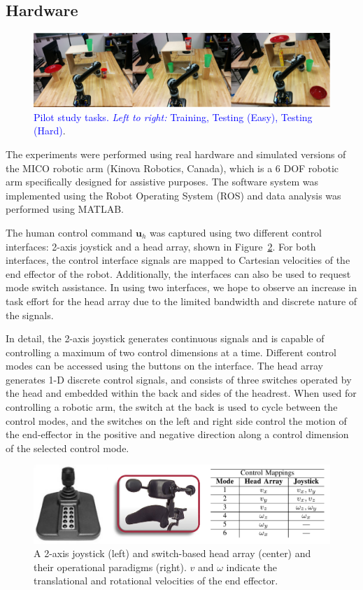 \documentclass[conference]{IEEEtran}
\begin{document}
 \subsection{Hardware}
 \begin{figure}[ht]
 	\centering
 	\includegraphics[width = 1\hsize]{./figures/TASKS.png}
 	\caption{\textcolor{blue}{Pilot study tasks. \textit{Left to right:} Training, Testing (Easy), Testing (Hard)}.}
 	\label{TASKS}
 \end{figure}
 The experiments were performed using real hardware and simulated versions of the MICO robotic arm (Kinova Robotics, Canada), which is a 6 DOF robotic arm specifically designed for assistive purposes. The software system was implemented using the Robot Operating System (ROS) and data analysis was performed using MATLAB. 
 
 The human control command $\boldsymbol{u}_h$ was captured using two different control interfaces: 2-axis joystick and a head array, shown in Figure~\ref{J2_HA}. For both interfaces, the control interface signals are mapped to Cartesian velocities of the end effector of the robot. Additionally, the interfaces can also be used to request mode switch assistance. In using two interfaces, we hope to observe an increase in task effort for the head array due to the limited bandwidth and discrete nature of the signals.
 
 In detail, the 2-axis joystick generates continuous signals and is capable of controlling a maximum of two control dimensions at a time. Different control modes can be accessed using the buttons on the interface. 
 The head array generates 1-D discrete control signals, and consists of three switches operated by the head and embedded within the back and sides of the headrest. When used for controlling a robotic arm, the switch at the back is used to cycle between the control modes, and the switches on the left and right side control the motion of the end-effector in the positive and negative direction along a control dimension of the selected control mode.
 
   \begin{figure}[h]
 	\centering
 	\includegraphics[width = 0.9\hsize, height = 0.1\vsize]{./figures/INTER.png}
 	\caption{A 2-axis joystick (left) and switch-based head array (center) and their operational paradigms (right). $v$ and $\omega$ indicate the translational and rotational velocities of the end effector.}
 	\label{J2_HA}
 \end{figure}
\end{document}
